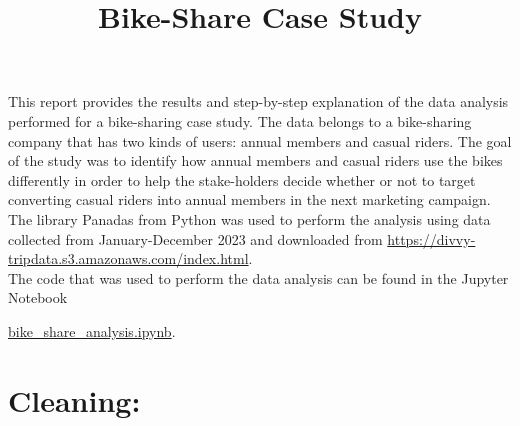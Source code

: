 \documentclass[12pt]{article}
\begin{document}
\title{Bike-Share Case Study}
\date{}
\maketitle

This report provides the results and step-by-step explanation of the data analysis performed for a bike-sharing case study. The data belongs to a bike-sharing company that has two kinds of users: annual members and casual riders. The goal of the study was to identify how annual members and casual riders use the bikes differently in order to help the stake-holders decide whether or not to target converting casual riders into annual members in the next marketing campaign. The library Panadas from Python was used to perform the analysis using data collected from January-December 2023 and downloaded from \url{https://divvy-tripdata.s3.amazonaws.com/index.html}. \\

The code that was used to perform the data analysis can be found in the Jupyter Notebook 

\href{https://github.com/SummerKassem/BikeShareCS/blob/main/Code/bike_share_analysis.ipynb}{bike\_share\_analysis.ipynb}.


\section*{Cleaning:}
\end{document}
